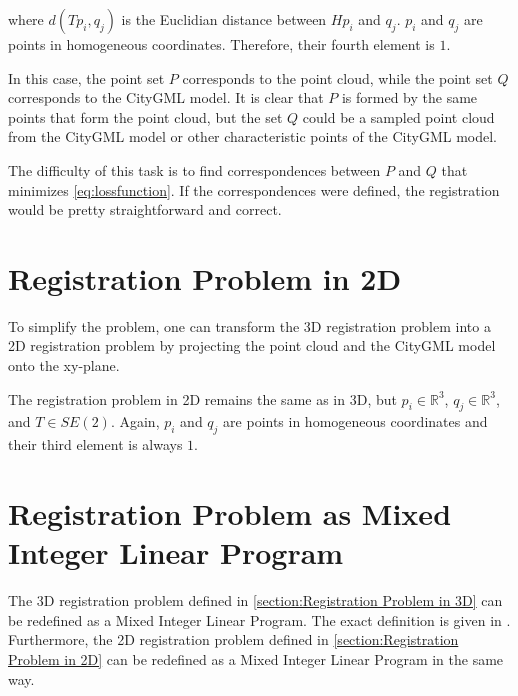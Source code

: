         where $d(T p_i, q_j)$ is the Euclidian distance between $H p_i$ and $q_j$.
        $p_i$ and $q_j$ are points in homogeneous coordinates. Therefore, their fourth element is $1$.

        In this case, the point set $P$ corresponds to the point cloud, while the point set $Q$ corresponds to the CityGML model.
        It is clear that $P$ is formed by the same points that form the point cloud, 
        but the set $Q$ could be a sampled point cloud from the CityGML model
        or other characteristic points of the CityGML model.
        
        The difficulty of this task is to find correspondences between $P$ and $Q$ that minimizes \autoref{eq:lossfunction}.
        If the correspondences were defined, the registration would be pretty straightforward and correct.

    \section{Registration Problem in 2D}
    \label{section:Registration Problem in 2D}
        To simplify the problem, one can transform the 3D registration problem into a 2D registration problem 
        by projecting the point cloud and the CityGML model onto the xy-plane.

        The registration problem in 2D remains the same as in 3D, but $p_i \in \mathbb{R}^{3}$, $q_j \in \mathbb {R}^{3}$, and $T \in SE(2)$.
        Again, $p_i$ and $q_j$ are points in homogeneous coordinates and their third element is always $1$.

    \section{Registration Problem as Mixed Integer Linear Program}
    \label{section:Registration Problem as Mixed Integer Linear Program}
        The 3D registration problem defined in \autoref{section:Registration Problem in 3D} can be redefined as a Mixed Integer Linear Program.
        The exact definition is given in \cite{Sakakubara_2007_automatic}. Furthermore, the 2D registration problem defined in \autoref{section:Registration Problem in 2D}
        can be redefined as a Mixed Integer Linear Program in the same way.
        
